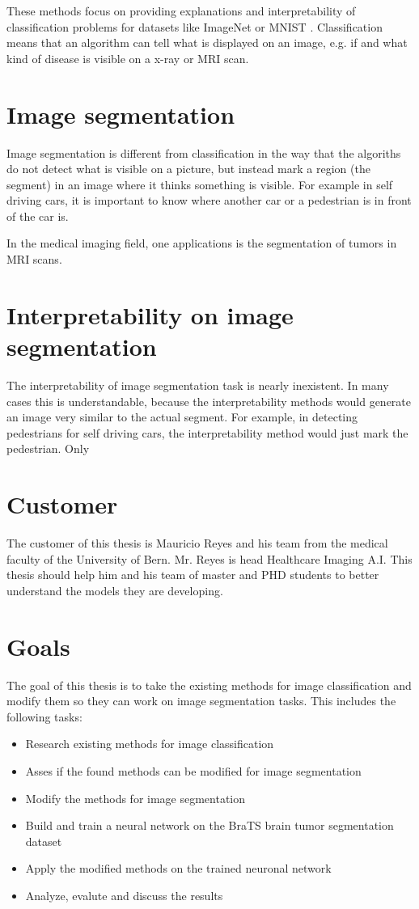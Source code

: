 These methods focus on providing explanations and interpretability of classification problems for datasets like ImageNet \cite{imagenet_cvpr09} or MNIST \cite{lecun-mnisthandwrittendigit-2010}. Classification means that an algorithm can tell what is displayed on an image, e.g. if and what kind of disease is visible on a x-ray or MRI scan.

\section{Image segmentation}
Image segmentation is different from classification in the way that the algoriths do not detect what is visible on a picture, but instead mark a region (the segment) in an image where it thinks something is visible. For example in self driving cars, it is important to know where another car or a pedestrian is in front of the car is. 

In the medical imaging field, one applications is the segmentation of tumors in MRI scans.

\section{Interpretability on image segmentation}
The interpretability of image segmentation task is nearly inexistent. In many cases this is understandable, because the interpretability methods would generate an image very similar to the actual segment. For example, in detecting pedestrians for self driving cars, the interpretability method would just mark the pedestrian. Only 

\section{Customer}
The customer of this thesis is Mauricio Reyes and his team from the medical faculty of the University of Bern. Mr. Reyes is head Healthcare Imaging A.I. This thesis should help him and his team of master and PHD students to better understand the models they are developing.

\section{Goals}
The goal of this thesis is to take the existing methods for image classification and modify them so they can work on image segmentation tasks. This includes the following tasks:
\begin{itemize}
    \item Research existing methods for image classification
    \item Asses if the found methods can be modified for image segmentation
    \item Modify the methods for image segmentation
    \item Build and train a neural network on the BraTS brain tumor segmentation dataset
    \item Apply the modified methods on the trained neuronal network
    \item Analyze, evalute and discuss the results
\end{itemize}

